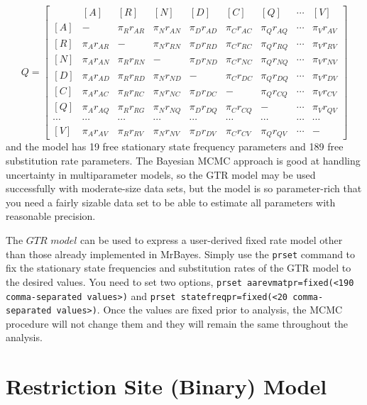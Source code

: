 \documentclass[12pt]{book}
\begin{document}
\footnotesize
\[
Q=\begin{bmatrix}
    & [A] & [R] & [N] & [D] & [C] & [Q] & \cdots & [V]\\
 [A]& - & \pi_{R} r_{AR}& \pi_{N} r_{AN} & \pi_{D} r_{AD}& \pi_{C} r_{AC}& \pi_{Q} r_{AQ} & \cdots & \pi_V r_{AV}\\
 [R]& \pi_{A} r_{AR} &- &  \pi_{N}  r_{RN}& \pi_{D} r_{RD}& \pi_{C} r_{RC}& \pi_{Q} r_{RQ} & \cdots & \pi_V r_{RV}\\
 [N]& \pi_{A} r_{AN}&\pi_{R} r_{RN}&- &   \pi_{D} r_{ND}& \pi_{C} r_{NC}& \pi_{Q} r_{NQ} & \cdots & \pi_V r_{NV}\\
 [D]& \pi_{A} r_{AD} &\pi_{R} r_{RD} &  \pi_{N} r_{ND}&- &  \pi_{C} r_{DC}& \pi_{Q} r_{DQ} & \cdots & \pi_V r_{DV}\\
 [C]& \pi_{A} r_{AC} &\pi_{R} r_{RC} &  \pi_{N} r_{NC}&  \pi_{D} r_{DC}&- & \pi_{Q} r_{CQ} & \cdots & \pi_V r_{CV}\\
 [Q]& \pi_{A} r_{AQ} &\pi_{R} r_{RG} &  \pi_{N} r_{NQ}&  \pi_{D} r_{DQ}& \pi_{C} r_{CQ} &- & \cdots & \pi_V r_{QV}\\
 \cdots& \cdots& \cdots& \cdots& \cdots& \cdots& \cdots& \cdots& \cdots\\
 [V]& \pi_{A} r_{AV} &\pi_{R} r_{RV} &  \pi_{N} r_{NV}&  \pi_{D} r_{DV}& \pi_{C} r_{CV} &\pi_Q r_{QV}& \cdots & -
\end{bmatrix}
\]
\normalsize
and the model has 19 free stationary state frequency parameters and 189 free substitution rate
parameters. The Bayesian MCMC approach is good at handling uncertainty in multiparameter models, so
the GTR model may be used successfully with moderate-size data sets, but the model is so
parameter-rich that you need a fairly sizable data set to be able to estimate all parameters with
reasonable precision.

The $GTR$ $model$ can be used to express a user-derived fixed rate model other than those already
implemented in MrBayes. Simply use the \texttt{prset} command to fix the stationary state
frequencies and substitution rates of the GTR model to the desired values. You need to set two
options, \texttt{prset aarevmatpr=fixed(<190 comma-separated values>)} and \texttt{prset
statefreqpr=fixed(<20 comma-separated values>)}. Once the values are fixed prior to analysis, the
MCMC procedure will not change them and they will remain the same throughout the analysis.

\section{Restriction Site (Binary) Model}
\end{document}
